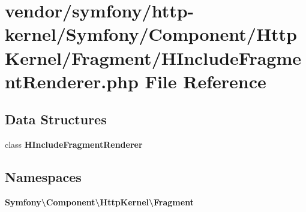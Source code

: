 \section{vendor/symfony/http-\/kernel/\+Symfony/\+Component/\+Http\+Kernel/\+Fragment/\+H\+Include\+Fragment\+Renderer.php File Reference}
\label{_h_include_fragment_renderer_8php}
\subsection*{Data Structures}
\begin{DoxyCompactItemize}
\item 
class {\bf H\+Include\+Fragment\+Renderer}
\end{DoxyCompactItemize}
\subsection*{Namespaces}
\begin{DoxyCompactItemize}
\item 
 {\bf Symfony\textbackslash{}\+Component\textbackslash{}\+Http\+Kernel\textbackslash{}\+Fragment}
\end{DoxyCompactItemize}
